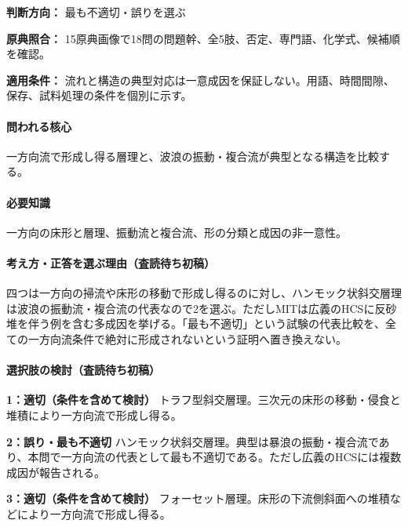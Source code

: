 \noindent\textbf{判断方向：} 最も不適切・誤りを選ぶ\par

\noindent\textbf{原典照合：} 15原典画像で18問の問題幹、全5肢、否定、専門語、化学式、候補順を確認。\par

\noindent\textbf{適用条件：} 流れと構造の典型対応は一意成因を保証しない。用語、時間間隙、保存、試料処理の条件を個別に示す。\par

\paragraph{問われる核心} 一方向流で形成し得る層理と、波浪の振動・複合流が典型となる構造を比較する。

\paragraph{必要知識} 一方向の床形と層理、振動流と複合流、形の分類と成因の非一意性。

\paragraph{考え方・正答を選ぶ理由（査読待ち初稿）} 四つは一方向の掃流や床形の移動で形成し得るのに対し、ハンモック状斜交層理は波浪の振動流・複合流の代表なので2を選ぶ。ただしMITは広義のHCSに反砂堆を伴う例を含む多成因を挙げる。「最も不適切」という試験の代表比較を、全ての一方向流条件で絶対に形成されないという証明へ置き換えない。

\paragraph{選択肢の検討（査読待ち初稿）}\mbox{}\par

\noindent\textbf{1：適切（条件を含めて検討）} トラフ型斜交層理。三次元の床形の移動・侵食と堆積により一方向流で形成し得る。\par

\noindent\textbf{2：誤り・最も不適切} ハンモック状斜交層理。典型は暴浪の振動・複合流であり、本問で一方向流の代表として最も不適切である。ただし広義のHCSには複数成因が報告される。\par

\noindent\textbf{3：適切（条件を含めて検討）} フォーセット層理。床形の下流側斜面への堆積などにより一方向流で形成し得る。\par

